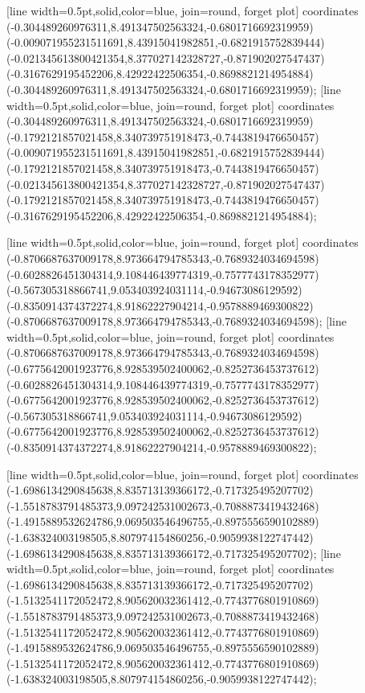 [line width=0.5pt,solid,color=blue, join=round, forget plot] coordinates {(-0.304489260976311,8.491347502563324,-0.6801716692319959) (-0.009071955231511691,8.43915041982851,-0.6821915752839444) (-0.021345613800421354,8.377027142328727,-0.871902027547437) (-0.3167629195452206,8.42922422506354,-0.8698821214954884) (-0.304489260976311,8.491347502563324,-0.6801716692319959)};
[line width=0.5pt,solid,color=blue, join=round, forget plot] coordinates {(-0.304489260976311,8.491347502563324,-0.6801716692319959) (-0.1792121857021458,8.340739751918473,-0.7443819476650457) (-0.009071955231511691,8.43915041982851,-0.6821915752839444) (-0.1792121857021458,8.340739751918473,-0.7443819476650457) (-0.021345613800421354,8.377027142328727,-0.871902027547437) (-0.1792121857021458,8.340739751918473,-0.7443819476650457) (-0.3167629195452206,8.42922422506354,-0.8698821214954884)};

[line width=0.5pt,solid,color=blue, join=round, forget plot] coordinates {(-0.8706687637009178,8.973664794785343,-0.7689324034694598) (-0.6028826451304314,9.108446439774319,-0.7577743178352977) (-0.567305318866741,9.053403924031114,-0.94673086129592) (-0.8350914374372274,8.91862227904214,-0.9578889469300822) (-0.8706687637009178,8.973664794785343,-0.7689324034694598)};
[line width=0.5pt,solid,color=blue, join=round, forget plot] coordinates {(-0.8706687637009178,8.973664794785343,-0.7689324034694598) (-0.6775642001923776,8.928539502400062,-0.8252736453737612) (-0.6028826451304314,9.108446439774319,-0.7577743178352977) (-0.6775642001923776,8.928539502400062,-0.8252736453737612) (-0.567305318866741,9.053403924031114,-0.94673086129592) (-0.6775642001923776,8.928539502400062,-0.8252736453737612) (-0.8350914374372274,8.91862227904214,-0.9578889469300822)};

[line width=0.5pt,solid,color=blue, join=round, forget plot] coordinates {(-1.6986134290845638,8.835713139366172,-0.717325495207702) (-1.5518783791485373,9.097242531002673,-0.7088873419432468) (-1.4915889532624786,9.069503546496755,-0.8975556590102889) (-1.638324003198505,8.807974154860256,-0.9059938122747442) (-1.6986134290845638,8.835713139366172,-0.717325495207702)};
[line width=0.5pt,solid,color=blue, join=round, forget plot] coordinates {(-1.6986134290845638,8.835713139366172,-0.717325495207702) (-1.5132541172052472,8.905620032361412,-0.7743776801910869) (-1.5518783791485373,9.097242531002673,-0.7088873419432468) (-1.5132541172052472,8.905620032361412,-0.7743776801910869) (-1.4915889532624786,9.069503546496755,-0.8975556590102889) (-1.5132541172052472,8.905620032361412,-0.7743776801910869) (-1.638324003198505,8.807974154860256,-0.9059938122747442)};

